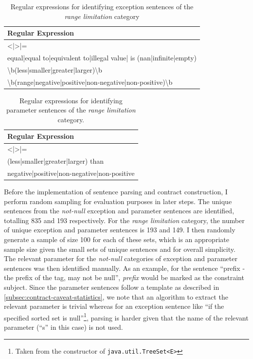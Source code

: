 \begin{table}[h]
	\centering
	\begin{tabular}{|l|}
		\hline
		\textbf{Regular Expression} \\ \hline
		\textless{}|\textgreater{}|= \\ \hline
		equal|equal to|equivalent to|illegal value| is (nan|infinite|empty) \\ \hline
		\textbackslash{}b(less|smaller|greater|larger)\textbackslash{}b \\ \hline
		\textbackslash{}b(range|negative|positive|non-negative|non-positive)\textbackslash{}b \\ \hline
	\end{tabular}
	\caption{Regular expressions for identifying exception sentences of the \textit{range limitation} category}
	\label{tab:except-range}
\end{table}
\clearpage
\begin{table}[h]
	\centering
	\begin{tabular}{|l|}
		\hline
		\textbf{Regular Expression} \\ \hline
		\textless{}|\textgreater{}|= \\ \hline
		(less|smaller|greater|larger) than \\ \hline
		negative|positive|non-negative|non-positive \\ \hline
	\end{tabular}
	\caption{Regular expressions for identifying parameter sentences of the \textit{range limitation} category.}
	\label{tab:param-range}
\end{table}


Before the implementation of sentence parsing and contract construction, I perform random sampling for evaluation purposes in later steps. The unique sentences from the \textit{not-null} exception and parameter sentences are identified, totalling 835 and 193 respectively. For the \textit{range limitation} category, the number of unique exception and parameter sentences is 193 and 149. I then randomly generate a sample of size 100 for each of these sets, which is an appropriate sample size given the small sets of unique sentences and for overall simplicity. The relevant parameter for the \textit{not-null} categories of exception and parameter sentences was then identified manually. As an example, for the sentence ``prefix - the prefix of the tag, may not be null'', \textit{prefix} would be marked as the constraint subject. Since the parameter sentences follow a template as described in \ref{subsec:contract-caveat-statistics}, we note that an algorithm to extract the relevant parameter is trivial whereas for an exception sentence like ``if the specified sorted set is null''\footnote{Taken from the constructor of \lstinline{java.util.TreeSet<E>}}, parsing is harder given that the name of the relevant parameter (``s'' in this case) is not used. \bigbreak

